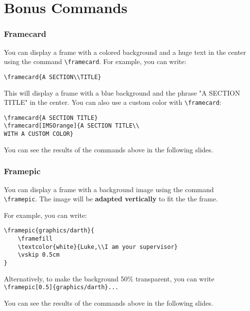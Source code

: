 \documentclass[usenames,dvipsnames,10pt,aspectratio=169]{beamer}
\newcommand{\framefill}{\vskip0pt plus 1filll}
\begin{document}
\section{Bonus Commands}

\begin{frame}[fragile]
\frametitle{Framecard}

You can display a frame with a colored background and a huge text in the center using the command \texttt{\textbackslash framecard}.
\vskip 0.5cm 
For example, you can write:
\begin{verbatim}
\framecard{A SECTION\\TITLE}
\end{verbatim}

This will display a frame with a blue background and the phrase "A SECTION TITLE" in the center. You can also use a custom color with \texttt{\textbackslash framecard}:
\begin{verbatim}
\framecard{A SECTION TITLE}
\framecard[IMSOrange]{A SECTION TITLE\\
WITH A CUSTOM COLOR}
\end{verbatim}
You can see the results of the commands above in the following slides.

\end{frame}


\begin{frame}[fragile]
\frametitle{Framepic}

You can display a frame with a background image using the command \texttt{\textbackslash framepic}. The image will be \textbf{adapted vertically} to fit the the frame. 

For example, you can write:
\begin{verbatim}
\framepic{graphics/darth}{
	\framefill
    \textcolor{white}{Luke,\\I am your supervisor}
    \vskip 0.5cm
}
\end{verbatim}

Alternatively, to make the background 50\% transparent, you can write \texttt{\textbackslash framepic[0.5]\{graphics/darth\}...}


You can see the results of the commands above in the following slides.

\end{frame}
\end{document}
